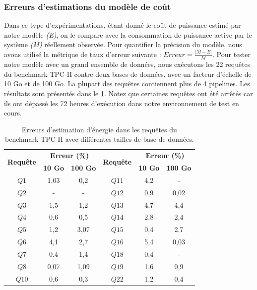 \subsubsection{Erreurs d'estimations du modèle de coût}\label{subsubsec:CostModelsErrorPostgres}
Dans ce type d'expérimentations, étant donné le coût de puissance estimé par notre modèle \textit{(E)}, on le compare avec la consommation de puissance active par le système \textit{(M)} réellement observée. Pour quantifier la précision du modèle, nous avons utilisé la métrique de taux d'erreur suivante : $Erreur = \frac{|M - E|}{M}$.
Pour tester notre modèle avec un grand ensemble de données, nous exécutons les 22 requêtes du benchmark TPC-H contre deux bases de données, avec un facteur d'échelle de 10 Go et de 100 Go. La plupart des requêtes contiennent plus de 4 pipelines. Les résultats sont présentés dans le \ref{tab:tpch-results-postgres-chap}.
Notez que certaines requêtes ont été arrêtés car ils ont dépassé les 72 heures d'exécution dans notre environnement de test en cours.

\begin{table}
\centering
\caption {Erreurs d'estimation d'énergie dans les requêtes du benchmark TPC-H avec différentes tailles de base de données.} \label{tab:tpch-results-postgres-chap}
\begin{tabular}{cccccc}
\toprule
\multirow{2}{*}{\textbf{Requête}} & \multicolumn{2}{c}{\textbf{Erreur (\%)}} & \multirow{2}{*}{\textbf{Requête}} & \multicolumn{2}{c}{\textbf{Erreur (\%)}} \\ \cmidrule(lr){2-3} \cmidrule(l){5-6} 
    & \textbf{10 Go} & \textbf{100 Go} & & \textbf{10 Go} & \textbf{100 Go} \\
\midrule
	$Q1$& 1,03 & 0,2 & $Q11$ & 4,2 & - \\
	$Q2$& - & - & $Q12$ & 0,9 & 0,02 \\
	$Q3$& 1,5 & 1,2 & $Q13$ & 4,7 & 4,4 \\ 
	$Q4$& 0,6 & 0,5 & $Q14$ & 2,8 & 2,4 \\ 
	$Q5$& 1,2 & 3,07 & $Q15$ & 0,4 & 2,7 \\ 
	$Q6$& 4,1 & 2,7 & $Q16$ & 5,4 & 0,03 \\ 
	$Q7$& 0,4 & 1,4 & $Q18$ & 0,4 & - \\ 
	$Q8$& 0,07 & 1,09 & $Q19$ & 1,6 & 0,9 \\ 
	$Q10$& 0,6 & 0,3 & $Q22$ & 1,2 & 0,4 \\
\bottomrule
\end{tabular}
\end{table}

